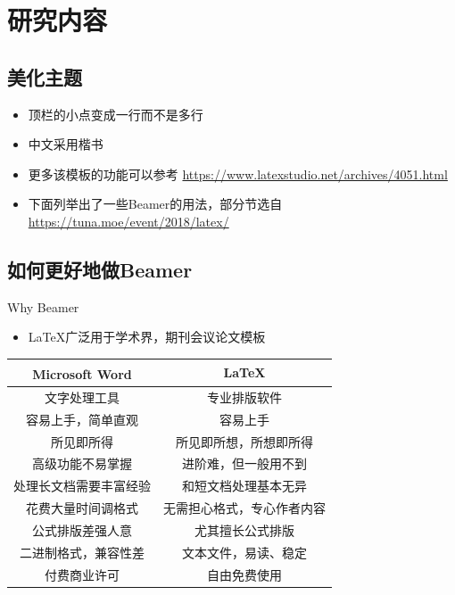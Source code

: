 \documentclass{beamer}
\begin{document}
	
	\section{研究内容}
	
	\subsection{美化主题}
	
	\begin{frame}
		\begin{itemize}
			\item 顶栏的小点变成一行而不是多行
			\item 中文采用楷书
			\item 更多该模板的功能可以参考 \url{https://www.latexstudio.net/archives/4051.html}
			\item 下面列举出了一些Beamer的用法，部分节选自 \url{https://tuna.moe/event/2018/latex/}
		\end{itemize}
	\end{frame}
	
	\subsection{如何更好地做Beamer}
	
	\begin{frame}{Why Beamer}
		\begin{itemize}
			\item \LaTeX 广泛用于学术界，期刊会议论文模板
		\end{itemize}
		\begin{table}[h]
			\centering
			\begin{tabular}{c|c}
				Microsoft\textsuperscript{\textregistered}  Word & \LaTeX \\
				\hline
				文字处理工具 & 专业排版软件 \\
				容易上手，简单直观 & 容易上手 \\
				所见即所得 & 所见即所想，所想即所得 \\
				高级功能不易掌握 & 进阶难，但一般用不到 \\
				处理长文档需要丰富经验 & 和短文档处理基本无异 \\
				花费大量时间调格式 & 无需担心格式，专心作者内容 \\
				公式排版差强人意 & 尤其擅长公式排版 \\
				二进制格式，兼容性差 & 文本文件，易读、稳定 \\
				付费商业许可 & 自由免费使用 \\
			\end{tabular}
		\end{table}
	\end{frame}
	
\end{document}
